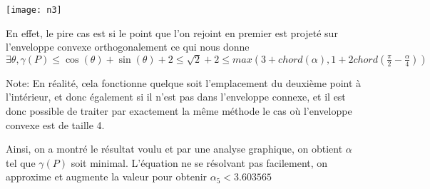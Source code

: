 \texttt{[image: n3]}

En effet, le pire cas est si le point que l'on rejoint en premier est projeté sur l'enveloppe convexe orthogonalement ce qui nous donne $\exists \theta, \gamma(P) \leq \cos(\theta) + \sin(\theta) + 2 \leq \sqrt{2} + 2 \leq max(3 + chord(\alpha), 1 + 2chord(\frac{\pi}{2} - \frac{\alpha}{4}))$

Note: En réalité, cela fonctionne quelque soit l'emplacement du deuxième point à l'intérieur, et donc également si il n'est pas dans l'enveloppe connexe, et il est donc possible de traiter par exactement la même méthode le cas où l'enveloppe convexe est de taille 4.

Ainsi, on a montré le résultat voulu et par une analyse graphique, on obtient $\alpha$ tel que $\gamma(P)$ soit minimal. L'équation ne se résolvant pas facilement, on approxime et augmente la valeur pour obtenir \(\alpha_5 < 3.603565\)